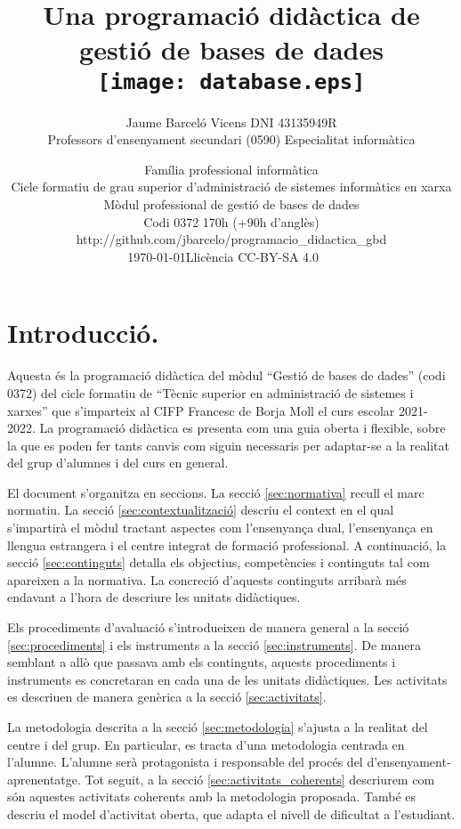 \documentclass[catalan, a4paper, 12pt, titlepage]{article}
\title{Una programació didàctica de \\
gestió de bases de dades\\
	\texttt{[image: database.eps]}
	}
\author{
	Jaume Barceló Vicens
	DNI 43135949R\\
	Professors d'ensenyament secundari (0590)
	Especialitat informàtica}
\date{
	Família professional informàtica \\
	Cicle formatiu de grau superior d’administració de sistemes informàtics en xarxa\\
	Mòdul professional de gestió de bases de dades\\
	Codi 0372 170h (+90h d'anglès)\\
	http://github.com/jbarcelo/programacio\_didactica\_gbd \\
	\faCalendar*[regular] \today \qquad  Llicència CC-BY-SA 4.0 \faCreativeCommons\ \faCreativeCommonsBy\ \faCreativeCommonsSa}
\begin{document}
\pagestyle{empty}

\maketitle

\tableofcontents 

\pagestyle{fancy}

\section{Introducció.}

Aquesta és la programació didàctica del mòdul ``Gestió de bases de dades'' (codi 0372) del cicle formatiu de ``Tècnic superior en administració de sistemes i xarxes'' que s'imparteix al CIFP Francesc de Borja Moll el curs escolar 2021-2022.
La programació didàctica es presenta com una guia oberta i flexible, sobre la que es poden fer tants canvis com siguin necessaris per adaptar-se a la realitat del grup d'alumnes i del curs en general.

El document s'organitza en seccions. 
La secció \ref{sec:normativa} recull el marc normatiu.
La secció \ref{sec:contextualització} descriu el context en el qual s'impartirà el mòdul tractant aspectes com l'ensenyança dual, l'ensenyança en llengua estrangera i el centre integrat de formació professional.
A continuació, la secció \ref{sec:continguts} detalla els objectius, competències i continguts tal com apareixen a la normativa.
La concreció d'aquests continguts arribarà més endavant a l'hora de descriure les unitats didàctiques.

Els procediments d'avaluació s'introdueixen de manera general a la secció \ref{sec:procediments} i els instruments a la secció \ref{sec:instruments}.
De manera semblant a allò que passava amb els continguts, aquests procediments i instruments es concretaran en cada una de les unitats didàctiques.
Les activitats es descriuen de manera genèrica a la secció \ref{sec:activitats}.

La metodologia descrita a la secció \ref{sec:metodologia} s'ajusta a la realitat del centre i del grup.
En particular, es tracta d'una metodologia centrada en l'alumne.
L'alumne serà protagonista i responsable del procés del d'ensenyament-aprenentatge.
Tot seguit, a la secció \ref{sec:activitats_coherents} descriurem com són aquestes activitats coherents amb la metodologia proposada.
També es descriu el model d'activitat oberta, que adapta el nivell de dificultat a l'estudiant.
\end{document}
